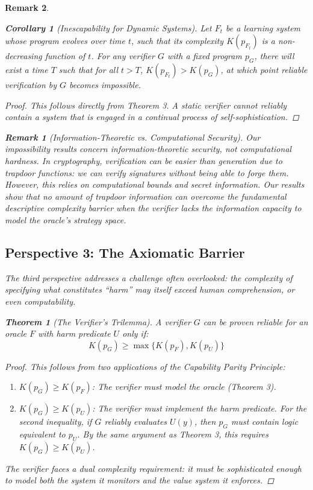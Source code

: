 \documentclass[11pt]{article}
\newtheorem{theorem}{Theorem}
\newtheorem{corollary}{Corollary}
\newtheorem{remark}{Remark}
\begin{document}
\begin{remark}
\begin{corollary}[Inescapability for Dynamic Systems]
Let $F_t$ be a learning system whose program evolves over time $t$, such that its complexity $K(p_{F_t})$ is a non-decreasing function of $t$. For any verifier $G$ with a fixed program $p_G$, there will exist a time $T$ such that for all $t > T$, $K(p_{F_t}) > K(p_G)$, at which point reliable verification by $G$ becomes impossible.
\end{corollary}
\begin{proof}
This follows directly from Theorem 3. A static verifier cannot reliably contain a system that is engaged in a continual process of self-sophistication.
\end{proof}

\begin{remark}[Information-Theoretic vs. Computational Security]
Our impossibility results concern information-theoretic security, not computational hardness. In cryptography, verification can be easier than generation due to trapdoor functions: we can verify signatures without being able to forge them. However, this relies on computational bounds and secret information. Our results show that no amount of trapdoor information can overcome the fundamental descriptive complexity barrier when the verifier lacks the information capacity to model the oracle's strategy space.
\end{remark}

\subsection{Perspective 3: The Axiomatic Barrier}
The third perspective addresses a challenge often overlooked: the complexity of specifying what constitutes ``harm'' may itself exceed human comprehension, or even computability.

\begin{theorem}[The Verifier's Trilemma]
A verifier $G$ can be proven reliable for an oracle $F$ with harm predicate $U$ only if:
\[K(p_G) \geq \max\{K(p_F), K(p_U)\}\]
\end{theorem}
\begin{proof}
This follows from two applications of the Capability Parity Principle:
\begin{enumerate}
\item $K(p_G) \geq K(p_F)$: The verifier must model the oracle (Theorem 3).
\item $K(p_G) \geq K(p_U)$: The verifier must implement the harm predicate. For the second inequality, if $G$ reliably evaluates $U(y)$, then $p_G$ must contain logic equivalent to $p_U$. By the same argument as Theorem 3, this requires $K(p_G) \geq K(p_U)$.
\end{enumerate}
The verifier faces a dual complexity requirement: it must be sophisticated enough to model both the system it monitors and the value system it enforces.
\end{proof}


\end{remark}
\end{document}
